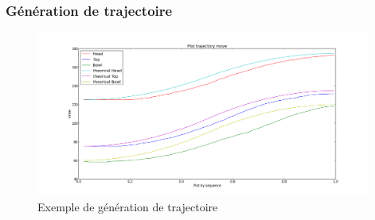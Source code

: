 \begin{frame}
  \frametitle{Génération de trajectoire}
            \begin{figure}
                \begin{center}
                    \includegraphics[width=11cm]{../img/TrajectoryPlot.png}
                \end{center}
                \caption{Exemple de génération de trajectoire}
            \end{figure}
\end{frame}
